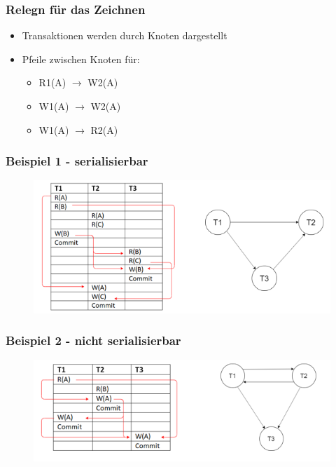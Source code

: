 \subsubsection*{Relegn für das Zeichnen}
\begin{itemize}
    \item Transaktionen werden durch Knoten dargestellt
    \item Pfeile zwischen Knoten für:
    \begin{itemize}
        \item R1(A) $\longrightarrow$ W2(A)
        \item W1(A) $\longrightarrow$ W2(A)
        \item W1(A) $\longrightarrow$ R2(A)
    \end{itemize}
\end{itemize}

\subsubsection*{Beispiel 1 - serialisierbar}
\begin{figure}[H]
\centering
    \includegraphics[scale=1.0]{Content/images/gleichzeitigkeit/example1.png}
\end{figure}

\subsubsection*{Beispiel 2 - nicht serialisierbar}
\begin{figure}[H]
\centering
    \includegraphics[scale=1.0]{Content/images/gleichzeitigkeit/example2.png}
\end{figure}

